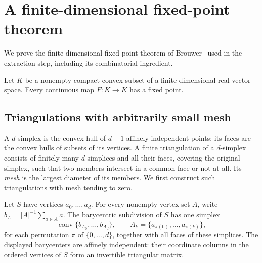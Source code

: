 \section{A finite-dimensional fixed-point theorem}
\label{sec:fixedpoint}

We prove the finite-dimensional fixed-point theorem of
Brouwer~\cite{Brouwer} used in the extraction step, including its
combinatorial ingredient.

\begin{theorem}\label{thm:fixedpoint}
Let \(K\) be a nonempty compact convex subset of a finite-dimensional
real vector space. Every continuous map \(F:K\to K\) has a fixed point.
\end{theorem}

\subsection{Triangulations with arbitrarily small mesh}

A \(d\)-simplex is the convex hull of \(d+1\) affinely independent
points; its faces are the convex hulls of subsets of its vertices.
A finite triangulation of a \(d\)-simplex consists of finitely many
\(d\)-simplices and all their faces, covering the original simplex,
such that two members intersect in a common face or not at all.
Its \emph{mesh} is the largest diameter of its members.
We first construct such triangulations with mesh tending to zero.

Let \(S\) have vertices \(a_0,\ldots,a_d\). For every nonempty
vertex set \(A\), write \(b_A=|A|^{-1}\sum_{a\in A}a\).
The barycentric subdivision of \(S\) has one simplex
\[
 \operatorname{conv}\{b_{A_0},\ldots,b_{A_d}\},\qquad
 A_k=\{a_{\pi(0)},\ldots,a_{\pi(k)}\},
\]
for each permutation \(\pi\) of \(\{0,\ldots,d\}\), together with
all faces of these simplices. The displayed barycenters are affinely
independent: their coordinate columns in the ordered vertices of
\(S\) form an invertible triangular matrix.

